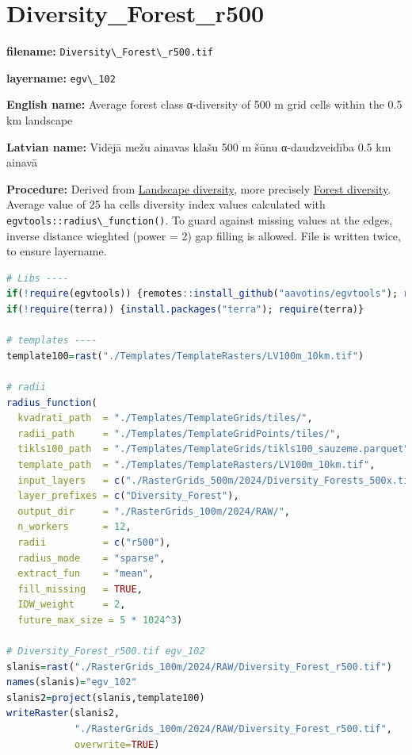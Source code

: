 \documentclass[
]{book}
\newcommand{\passthrough}[1]{#1}
\begin{document}
\section{Diversity\_Forest\_r500}\label{ch06.102}

\textbf{filename:} \passthrough{\lstinline!Diversity\_Forest\_r500.tif!}

\textbf{layername:} \passthrough{\lstinline!egv\_102!}

\textbf{English name:} Average forest class α-diversity of 500 m grid cells within the 0.5 km landscape

\textbf{Latvian name:} Vidējā mežu ainavas klašu 500 m šūnu α-daudzveidība 0.5 km ainavā

\textbf{Procedure:} Derived from \hyperref[Ch05.04]{Landscape diversity}, more precisely
\hyperref[Ch05.04.02]{Forest diversity}. Average value of 25 ha
cells diversity index values calculated with \passthrough{\lstinline!egvtools::radius\_function()!}. To
guard against missing values at the edges, inverse distance wieghted (power = 2)
gap filling is allowed. File is written twice, to ensure layername.

\begin{lstlisting}[language=R]
# Libs ----
if(!require(egvtools)) {remotes::install_github("aavotins/egvtools"); require(egvtools)}
if(!require(terra)) {install.packages("terra"); require(terra)}

# templates ----
template100=rast("./Templates/TemplateRasters/LV100m_10km.tif")

# radii
radius_function(
  kvadrati_path  = "./Templates/TemplateGrids/tiles/",
  radii_path     = "./Templates/TemplateGridPoints/tiles/",
  tikls100_path  = "./Templates/TemplateGrids/tikls100_sauzeme.parquet",
  template_path  = "./Templates/TemplateRasters/LV100m_10km.tif",
  input_layers   = c("./RasterGrids_500m/2024/Diversity_Forests_500x.tif"),
  layer_prefixes = c("Diversity_Forest"),
  output_dir     = "./RasterGrids_100m/2024/RAW/",
  n_workers      = 12,
  radii          = c("r500"),
  radius_mode    = "sparse",
  extract_fun    = "mean",
  fill_missing   = TRUE,
  IDW_weight     = 2,
  future_max_size = 5 * 1024^3)

# Diversity_Forest_r500.tif egv_102
slanis=rast("./RasterGrids_100m/2024/RAW/Diversity_Forest_r500.tif")
names(slanis)="egv_102"
slanis2=project(slanis,template100)
writeRaster(slanis2,
            "./RasterGrids_100m/2024/RAW/Diversity_Forest_r500.tif",
            overwrite=TRUE)
\end{lstlisting}
\end{document}
